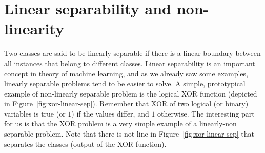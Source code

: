 \section{Linear separability and non-linearity}

\begin{marginfigure}
  \centering
  \caption{\label{fig:xor-linear-sep}%
    XOR function as an example of non-linear separability.
    The inputs are $x_{1}$ and $x_{2}$, 
    and the label $-$ used
    for cases where  $x_{1} \;\text{xor}\; x_{2}$ is  $0$,
    and the label $+$ used  
    for cases where  $x_{1} \;\text{xor}\; x_{2}$ is $1$.
  }
\end{marginfigure}
Two classes are said to be linearly separable
if there is a linear boundary between all instances
that belong to different classes.
Linear separability is an important concept in theory of machine learning,
and as we already saw some examples,
linearly separable problems tend to be easier to solve.
A simple, prototypical example of non-linearly separable problem is 
the logical XOR function (depicted in Figure~\ref{fig:xor-linear-sep}).
Remember that XOR of two logical (or binary) variables is true (or $1$) if 
the values differ, and $1$ otherwise.
The interesting part for us is that the XOR problem is a very simple
example of a linearly-non separable problem.
Note that there is not line in Figure~\ref{fig:xor-linear-sep}
that separates the classes (output of the XOR function).%

